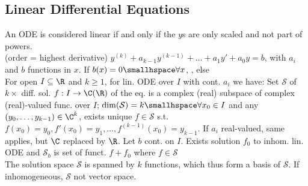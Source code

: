 \newsectionNoPB
\subsection{Linear Differential Equations}
An ODE is considered linear if and only if the $y$s are only scaled and not part of powers.\\
 (order = highest derivative)
$y^{(k)} + a_{k - 1}y^{(k - 1)} + \ldots + a_1 y' + a_0 y = b$, with $a_i$ and $b$ functions in $x$. 
If $b(x) = 0 \smallhspace \forall x$, , else \\
%
\shorttheorem For open $I \subseteq \R$ and $k \geq 1$, for lin. ODE over $I$ with cont. $a_i$ we have:
 Set $\mathcal{S}$ of $k \times$ diff. sol. $f: I \rightarrow \C (\R)$ of the eq. is a complex (real) subspace of complex (real)-valued func. over $I$;
 $\dim(\mathcal{S}) = k \smallhspace\forall x_0 \in I$ and any $(y_0, \ldots, y_{k - 1}) \in \C^k$, exists unique $f \in \mathcal{S}$ s.t. $f(x_0) = y_0, f'(x_0) = y_1, \ldots, f^{(k - 1)}(x_0) = y_{k - 1}$. If $a_i$ real-valued, same applies, but $\C$ replaced by $\R$.
 Let $b$ cont. on $I$. Exists solution $f_0$ to inhom. lin. ODE and $\mathcal{S}_b$ is set of funct. $f + f_0$ where $f \in \mathcal{S}$\\
The solution space $\mathcal{S}$ is spanned by $k$ functions, which thus form a basis of $\mathcal{S}$. If inhomogeneous, $\mathcal{S}$ not vector space.
